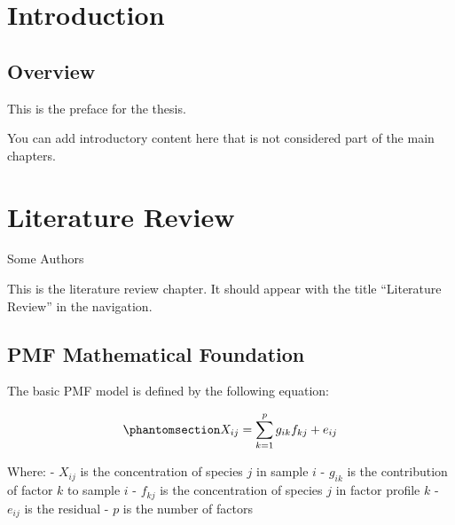 \documentclass[
  letterpaper,
  oneside,
  openany]{MastersDoctoralThesis}
\begin{document}
\mainmatter %
\pagestyle{thesis} %


\chapter*{Introduction}\label{introduction}


\section*{Overview}\label{overview}


This is the preface for the thesis.

You can add introductory content here that is not considered part of the
main chapters.


\chapter{Literature Review}\label{sec-ch1-literature}

\begin{center}
Some Authors

\end{center}

This is the literature review chapter. It should appear with the title
``Literature Review'' in the navigation.

\section{PMF Mathematical Foundation}\label{sec-ch1-pmf-math}

The basic PMF model is defined by the following equation:

\begin{equation}\phantomsection\label{eq-pmf-basic}{X_{ij} = \sum_{k=1}^{p} g_{ik}f_{kj} + e_{ij}}\end{equation}

Where: - \(X_{ij}\) is the concentration of species \(j\) in sample
\(i\) - \(g_{ik}\) is the contribution of factor \(k\) to sample \(i\) -
\(f_{kj}\) is the concentration of species \(j\) in factor profile \(k\)
- \(e_{ij}\) is the residual - \(p\) is the number of factors
\end{document}
